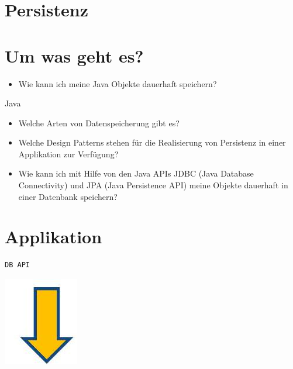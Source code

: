 \section{Persistenz}

\section*{Um was geht es?}
\begin{itemize}
  \item Wie kann ich meine Java Objekte dauerhaft speichern?
\end{itemize}

Java

\begin{itemize}
  \item Welche Arten von Datenspeicherung gibt es?
  \item Welche Design Patterns stehen für die Realisierung von Persistenz in einer Applikation zur Verfügung?
  \item Wie kann ich mit Hilfe von den Java APIs JDBC (Java Database Connectivity) und JPA (Java Persistence API) meine Objekte dauerhaft in einer Datenbank speichern?
\end{itemize}

\section*{Applikation}
\begin{verbatim}
DB API
\end{verbatim}

\begin{center}
\includegraphics[width=\linewidth]{images/2025_01_02_5ba1dc702e9f94ba8e06g-02}
\end{center}

